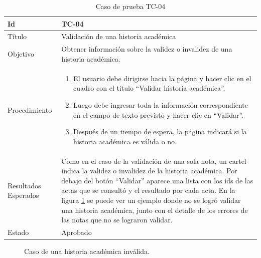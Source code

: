 \begin{table}[H]
\begin{tabularx}{\textwidth}{|m{3cm}|X|}
\hline
Id & TC-04\\
\hline
Título & Validación de una historia académica \\
\hline
Objetivo & Obtener información sobre la validez o invalidez de una historia académica.\\
\hline
Procedimiento & \begin{enumerate}
    \item El usuario debe dirigirse hacia la página y hacer clic en el cuadro con el título ``Validar historia académica''.
    \item Luego debe ingresar toda la información correspondiente en el campo de texto previsto y hacer clic en ``Validar''.
    \item Después de un tiempo de espera, la página indicará si la historia académica es válida o no.
\end{enumerate}\\
\hline
Resultados Esperados & Como en el caso de la validación de una sola nota, un cartel indica la validez o invalidez de la historia académica. Por debajo del botón ``Validar'' aparece una lista con los ids de las actas que se consultó y el resultado por cada acta. En la figura \ref{fig:academic_history_fail} se puede ver un ejemplo donde no se logró validar una historia académica, junto con el detalle de los errores de las notas que no se lograron validar. \\
\hline
Estado & Aprobado\\
\hline
\end{tabularx}
\caption{Caso de prueba TC-04}
\end{table}

\begin{figure}[H]
    \caption{Caso de una historia académica inválida.}
    \label{fig:academic_history_fail}
\end{figure}

